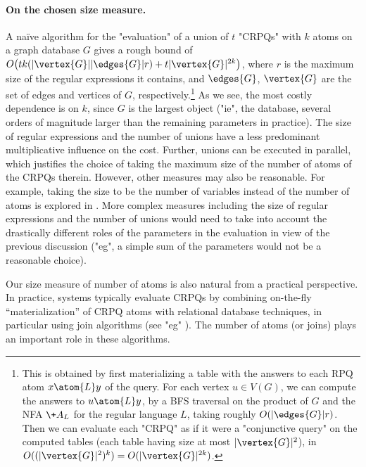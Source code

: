 \paragraph{On the chosen size measure.}
A naïve algorithm for the "evaluation" of a union of $t$ "CRPQs" with $k$ atoms on a graph database $G$ gives a rough bound of $O\big(t  k  (|\vertex{G}||\edges{G}| r) + t  |\vertex{G}|^{2k}\big)$, where $r$ is the maximum size of the regular expressions it contains, and $\edges{G}$, $\vertex{G}$ are the set of edges and vertices of $G$, respectively.\footnote{This is obtained by first materializing a table with the answers to each RPQ atom $x \atom{L} y$ of the query. For each vertex $u\in V(G)$, we can compute the answers to $u \atom{L} y$, by a BFS traversal on the product of $G$ and   the NFA $\+A_L$ for the regular language $L$, taking roughly $O(|\edges{G}| r)$. Then we can evaluate each "CRPQ" as if it were a "conjunctive query" on the computed tables (each table having size at most $|\vertex{G}|^2$), in $O((|\vertex{G}|^2)^k) = O(|\vertex{G}|^{2k})$.}
As we see, the most costly dependence is on $k$, since $G$ is the largest object ("ie", the database, several orders of magnitude larger than the remaining parameters in practice). The size of regular expressions and the number of unions have a less predominant multiplicative influence on the cost.
Further, unions can be executed in parallel, which justifies the choice of taking the maximum size of the number of atoms of the CRPQs therein.
However, other measures may also be reasonable. For example, taking the size to be the number of variables instead of the number of atoms is explored in .
More complex measures including the size of regular expressions and the number of unions would need to take into account the drastically different roles of the parameters in the evaluation in view of the previous discussion ("eg", a simple sum of the parameters would not be a reasonable choice).

Our size measure of number of atoms is also natural from a practical perspective. In practice, systems typically evaluate CRPQs by combining   on-the-fly ``materialization'' of CRPQ atoms  with  relational database techniques, in particular using join algorithms (see "eg" \cite{VrgocEtal2024MillenniumDB,KaralisBigerlHeidrichSherifNgongaNgomo2024Efficient,CucumidesReutterVrgoc2024SizeBounds}).  The number of atoms (or joins) plays an important role in these algorithms.
	
